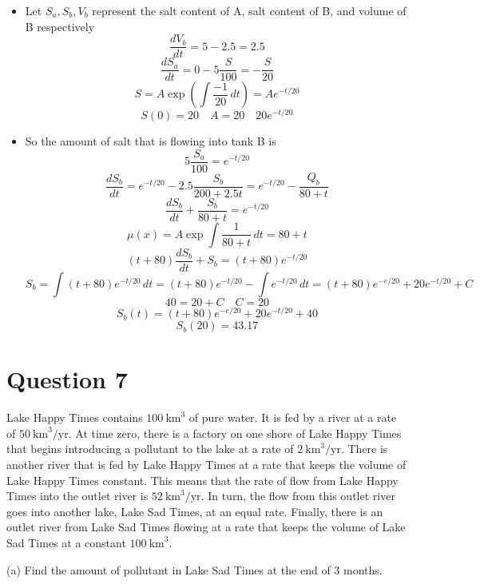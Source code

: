 \documentclass[hidelinks]{article}
\begin{document}
\begin{itemize}
    \item[ ] Let $S_a, S_b, V_b$ represent the salt content of A, salt content of B, and volume of B respectively
    \[
        \frac{dV_b}{dt} = 5 - 2.5 = 2.5 
    \]
    \[
        \frac{dS_a}{dt} = 0 - 5 \frac{S}{100} = -\frac{S}{20}
    \]
    \[
        S = A\exp(\int \frac{-1}{20} \, dt) = Ae^{-t/20}
    \]
    \[
        S(0) = 20 \quad A = 20 \quad 20e^{-t/20}
    \]
    \item[ ] So the amount of salt that is flowing into tank B is 
    \[
        5 \frac{S_a}{100} = e^{-t/20}
    \]
    \[
        \frac{dS_b}{dt} = e^{-t/20} - 2.5\frac{S_b}{200 + 2.5t} = e^{-t/20} - \frac{Q_b}{80 + t}
    \]
    \[
        \frac{dS_b}{dt} + \frac{S_b}{80+t} = e^{-t/20}
    \]
    \[
        \mu(x) = A\exp\int\frac{1}{80+t} \, dt = 80 + t 
    \]
    \[
        (t+80)\frac{dS_b}{dt} + S_b = (t+80)e^{-t/20}
    \]
    \[
        S_b = \int (t+80)e^{-t/20} \, dt
        = (t+80)e^{-t/20} - \int e^{-t/20} \, dt
        = (t+80)e^{-e/20} + 20e^{-t/20} + C
    \]
    \[
    40 = 20 + C \quad C = 20 
    \]
    \[
        S_b(t) = (t+80)e^{-e/20} + 20e^{-t/20} + 40
    \]
    \[
        S_b(20) = 43.17
    \]
\end{itemize}
\newpage
\section*{Question 7}
Lake Happy Times contains $100 \mathrm{~km}^3$ of pure water. It is fed by a river at a rate of $50 \mathrm{~km}^3 / \mathrm{yr}$. At time zero, there is a factory on one shore of Lake Happy Times that begins introducing a pollutant to the lake at a rate of $2 \mathrm{~km}^3 / \mathrm{yr}$. There is another river that is fed by Lake Happy Times at a rate that keeps the volume of Lake Happy Times constant. This means that the rate of flow from Lake Happy Times into the outlet river is $52 \mathrm{~km}^3 / \mathrm{yr}$. In turn, the flow from this outlet river goes into another lake, Lake Sad Times, at an equal rate. Finally, there is an outlet river from Lake Sad Times flowing at a rate that keeps the volume of Lake Sad Times at a constant $100 \mathrm{~km}^3$.

(a) Find the amount of pollutant in Lake Sad Times at the end of 3 months.
\end{document}
